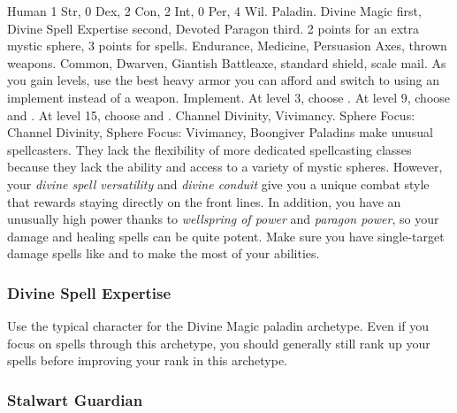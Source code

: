              Human
             1 Str, 0 Dex, 2 Con, 2 Int, 0 Per, 4 Wil.
             Paladin.
             Divine Magic first, Divine Spell Expertise second, Devoted Paragon third.
             2 points for an extra mystic sphere, 3 points for spells.
             Endurance, Medicine, Persuasion
             Axes, thrown weapons.
             Common, Dwarven, Giantish
             Battleaxe, standard shield, scale mail. As you gain levels, use the best heavy armor you can afford and switch to using an implement instead of a weapon.
             Implement.
                At level 3, choose .
                At level 9, choose  and .
                At level 15, choose  and .
             Channel Divinity, Vivimancy.
             Sphere Focus: Channel Divinity, Sphere Focus: Vivimancy, Boongiver
             Paladins make unusual spellcasters.
            They lack the flexibility of more dedicated spellcasting classes because they lack the  ability and access to a variety of mystic spheres.
            However, your \textit{divine spell versatility} and \textit{divine conduit} give you a unique combat style that rewards staying directly on the front lines.
            In addition, you have an unusually high power thanks to \textit{wellspring of power} and \textit{paragon power}, so your damage and healing spells can be quite potent.
            Make sure you have single-target damage spells like  and  to make the most of your abilities.

        \subsubsection{Divine Spell Expertise}
            Use the typical character for the Divine Magic paladin archetype.
            Even if you focus on spells through this archetype, you should generally still rank up your spells before improving your rank in this archetype.

        \subsubsection{Stalwart Guardian}

